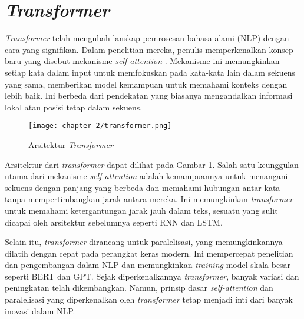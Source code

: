 \section{\textit{Transformer}}

\textit{Transformer} telah mengubah lanskap pemrosesan bahasa alami (NLP) dengan cara yang signifikan. Dalam penelitian mereka, penulis memperkenalkan konsep baru yang disebut mekanisme \textit{self-attention} \parencite{transformers}. Mekanisme ini memungkinkan setiap kata dalam input untuk memfokuskan pada kata-kata lain dalam sekuens yang sama, memberikan model kemampuan untuk memahami konteks dengan lebih baik. Ini berbeda dari pendekatan yang biasanya mengandalkan informasi lokal atau posisi tetap dalam sekuens.

\begin{figure}[ht]
    \centering
    \texttt{[image: chapter-2/transformer.png]}
    \caption{Arsitektur \textit{Transformer} \parencite{transformers}}
    \label{fig:transformer}
\end{figure}

Arsitektur dari \textit{transformer} dapat dilihat pada Gambar \ref{fig:transformer}. Salah satu keunggulan utama dari mekanisme \textit{self-attention} adalah kemampuannya untuk menangani sekuens dengan panjang yang berbeda dan memahami hubungan antar kata tanpa mempertimbangkan jarak antara mereka. Ini memungkinkan \textit{transformer} untuk memahami ketergantungan jarak jauh dalam teks, sesuatu yang sulit dicapai oleh arsitektur sebelumnya seperti RNN dan LSTM.

Selain itu, \textit{transformer} dirancang untuk paralelisasi, yang memungkinkannya dilatih dengan cepat pada perangkat keras modern. Ini mempercepat penelitian dan pengembangan dalam NLP dan memungkinkan \textit{training} model skala besar seperti BERT dan GPT. Sejak diperkenalkannya \textit{transformer}, banyak variasi dan peningkatan telah dikembangkan. Namun, prinsip dasar \textit{self-attention} dan paralelisasi yang diperkenalkan oleh \textit{transformer} tetap menjadi inti dari banyak inovasi dalam NLP.